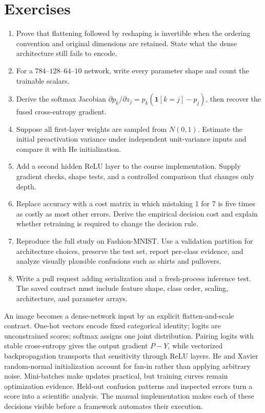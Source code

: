 \section{Exercises}
\begin{enumerate}
  \item Prove that flattening followed by reshaping is invertible when the
  ordering convention and original dimensions are retained. State what the
  dense architecture still fails to encode.
  \item For a $784$--$128$--$64$--$10$ network, write every parameter shape
  and count the trainable scalars.
  \item Derive the softmax Jacobian
  $\partial p_k/\partial z_j=p_k(\mathbf1[k=j]-p_j)$, then recover the fused
  cross-entropy gradient.
  \item Suppose all first-layer weights are sampled from $N(0,1)$. Estimate
  the initial preactivation variance under independent unit-variance inputs
  and compare it with He initialization.
  \item Add a second hidden ReLU layer to the course implementation. Supply
  gradient checks, shape tests, and a controlled comparison that changes only
  depth.
  \item Replace accuracy with a cost matrix in which mistaking 1 for 7 is five
  times as costly as most other errors. Derive the empirical decision cost and
  explain whether retraining is required to change the decision rule.
  \item Reproduce the full study on Fashion-MNIST. Use a validation partition
  for architecture choices, preserve the test set, report per-class evidence,
  and analyze visually plausible confusions such as shirts and pullovers.
  \item Write a pull request adding serialization and a fresh-process inference
  test. The saved contract must include feature shape, class order, scaling,
  architecture, and parameter arrays.
\end{enumerate}

\begin{chapterreview}
An image becomes a dense-network input by an explicit flatten-and-scale
contract. One-hot vectors encode fixed categorical identity; logits are
unconstrained scores; softmax assigns one joint distribution. Pairing logits
with stable cross-entropy gives the output gradient $P-Y$, while vectorized
backpropagation transports that sensitivity through ReLU layers. He and Xavier
random-normal initialization account for fan-in rather than applying arbitrary
noise. Mini-batches make updates practical, but training curves remain
optimization evidence. Held-out confusion patterns and inspected errors turn a
score into a scientific analysis. The manual implementation makes each of
these decisions visible before a framework automates their execution.
\end{chapterreview}

